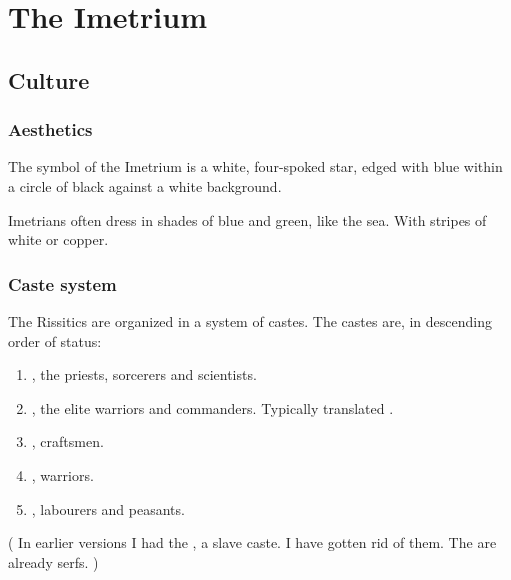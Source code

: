 \chapter{The Imetrium}









\section{Culture}





\subsection{Aesthetics}
The symbol of the Imetrium is a white, four-spoked star, edged with blue within a circle of black against a white background. 

Imetrians often dress in shades of blue and green, like the sea. 
With stripes of white or copper.









\subsection{Caste system}
The Rissitics are organized in a system of castes.
The castes are, in descending order of status:

\begin{enumerate}
  \item \Nyzlet, the priests, sorcerers and scientists.
  \item \Reken, the elite warriors and commanders. 
    Typically translated . 
  \item \Bedhin, craftsmen.
  \item \Kyth, warriors. 
  \item \Hok, labourers and peasants.
\end{enumerate}

(%
  In earlier versions I had the , a slave caste. 
  I have gotten rid of them. 
  The \hok{} are already serfs.%
)







